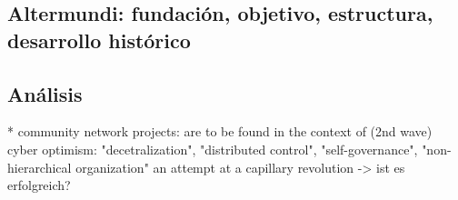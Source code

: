 \begin{comment}
anti sistemas autocratas:
"Anlässe für dieses neuerliche Interesse sind etwa die Versuche in autoritären
Staaten, das Internet komplett abzuschalten, um den Informationsaustausch
zu verhindern."[p.12][Mabb2014]

auch fuer Katastrophenfaelle relevant
"Ein weiteres Einsatzfeld sind Mesh-Netze im Katastrophenfall, besonders nach
Naturkatastrophen. So nutzten etwa nach dem Hurrikan Sandy Bürger im Brook-
lyner Viertel Red Hook ein solches, bereits vorhandenes und weiter funktionsfä-
higes Netz. Es wurde um einen Dienst erweitert, über den Bewohner Schäden ­
melden und lokale Informationen austauschen konnten. Zusammen mit der
Katastrophenschutzbehörde wurde das lokale Netz provisorisch per Satellit
ans Internet angebunden. Der dort eingesetzte technische Werkzeugkasten
des „Commotion Wireless Project“ teilt viele Komponenten mit dem deutschen
Freifunk."[p.12][Mabb2014]

bridging the digital devide!

surgen de necesidades locales:
por ejemplo en el caso de Altermundi: pequeños pueblos, poblaciones en las altas cumbres; localidades donde los proveedores convencionales no ven oportunidad de lucro y por eso no prestan servicio

se ubican en el contexto del ciberoptimismo (DEF)

reflexión crítica: está la solución fiable en gran escala: vgl papel del estado (IV Gui); última milla
\end{comment}

\subsection{Altermundi: fundación, objetivo, estructura, desarrollo histórico}
\begin{comment}
* existe en su forma actual desde 2012
* objetivo: facilitar la construcción y el mantenimiento de redes comunitarias inalámbricas
* grupo básico de activistas + redes locales autónomas
* educar y concienciar: talleres, empoderamiento, el grupo central en papel consultativo
* la comunidad decide
\end{comment}


\subsection{Análisis}
* community network projects: are to be found in the context of (2nd wave) cyber optimism: "decetralization", "distributed control", "self-governance", "non-hierarchical organization"
an attempt at a capillary revolution -> ist es erfolgreich?

